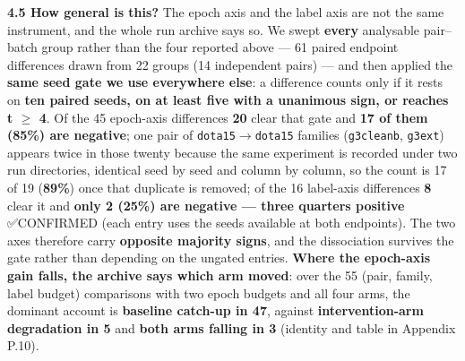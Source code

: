 \documentclass[pdflatex,sn-mathphys-ay]{sn-jnl}
\begin{document}
\textbf{4.5 How general is this?} The epoch axis and the label axis are not the same instrument, and the whole run archive says so. We swept \textbf{every} analysable pair--batch group rather than the four reported above --- 61 paired endpoint differences drawn from 22 groups (14 independent pairs) --- and then applied the \textbf{same seed gate we use everywhere else}: a difference counts only if it rests on \textbf{ten paired seeds, on at least five with a unanimous sign, or reaches \textbar{}t\textbar{} \ensuremath{\geq} 4}. Of the 45 epoch-axis differences \textbf{20} clear that gate and \textbf{17 of them (85\%) are negative}; one pair of \texttt{dota15\ensuremath{\rightarrow}dota15} families (\texttt{g3cleanb}, \texttt{g3ext}) appears twice in those twenty because the same experiment is recorded under two run directories, identical seed by seed and column by column, so the count is 17 of 19 (\textbf{89\%}) once that duplicate is removed; of the 16 label-axis differences \textbf{8} clear it and \textbf{only 2 (25\%) are negative --- three quarters positive} ✅CONFIRMED (each entry uses the seeds available at both endpoints). The two axes therefore carry \textbf{opposite majority signs}, and the dissociation survives the gate rather than depending on the ungated entries. \textbf{Where the epoch-axis gain falls, the archive says which arm moved}: over the 55 (pair, family, label budget) comparisons with two epoch budgets and all four arms, the dominant account is \textbf{baseline catch-up in 47}, against \textbf{intervention-arm degradation in 5} and \textbf{both arms falling in 3} (identity and table in Appendix P.10).
\end{document}
